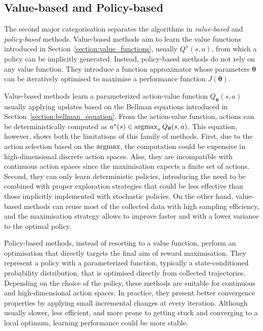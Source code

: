 \subsection{Value-based and Policy-based}

The second major categorisation separates the algorithms in \emph{value-based} and \emph{policy-based} methods.
Value-based methods aim to learn the value functions introduced in Section~\ref{section:value_functions}, usually $Q^\pi(s, a)$, from which a policy can be implicitly generated.
Instead, policy-based methods do not rely on any value function.
They introduce a function approximator whose parameters $\boldsymbol{\theta}$ can be iteratively optimised to maximise a performance function $J(\boldsymbol{\theta})$.

Value-based methods learn a parameterized action-value function $Q_{\boldsymbol{\theta}}(s, a)$ usually applying updates based on the Bellman equations introduced in Section~\ref{section:bellman_equation}.
From the action-value function, actions can be deterministically computed as $a^*(s) \in \operatorname*{argmax}_a Q_{\boldsymbol{\theta}}(s, a)$.
This equation, however, shows both the limitations of this family of methods.
First, due to the action selection based on the $\operatorname*{argmax}$, the computation could be expensive in high-dimensional discrete action spaces.
Also, they are incompatible with continuous action spaces since the maximisation expects a finite set of actions.
Second, they can only learn deterministic policies, introducing the need to be combined with proper exploration strategies that could be less effective than those implicitly implemented with stochastic policies.
On the other hand, value-based methods can reuse most of the collected data with high sampling efficiency, and the maximisation strategy allows to improve faster and with a lower variance to the optimal policy.

Policy-based methods, instead of resorting to a value function, perform an optimisation that directly targets the final aim of reward maximisation.
They represent a policy with a parameterized function, typically a state-conditioned probability distribution, that is optimised directly from collected trajectories.
Depending on the choice of the policy, these methods are suitable for continuous and high-dimensional action spaces.
In practice, they present better convergence properties by applying small incremental changes at every iteration.
Although usually slower, less efficient, and more prone to getting stuck and converging to a local optimum, learning performance could be more stable.

